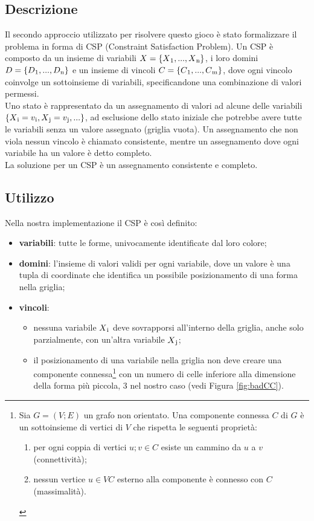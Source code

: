 \subsection{Descrizione}
Il secondo approccio utilizzato per risolvere questo gioco è stato formalizzare il problema in forma di CSP (Constraint Satisfaction Problem). Un CSP è composto da un insieme di variabili $X = \{X\textsubscript{1},...,X\textsubscript{n}\}$, i loro domini  $D = \{D\textsubscript{1},...,D\textsubscript{n}\}$ e un insieme di vincoli  $C = \{C\textsubscript{1},...,C\textsubscript{m}\}$, dove ogni vincolo coinvolge un sottoinsieme di variabili, specificandone una combinazione di valori permessi.\\
Uno stato è rappresentato da un assegnamento di valori ad alcune delle variabili $\{X\textsubscript{i} = v\textsubscript{i}, X\textsubscript{j} = v\textsubscript{j},...\}$, ad esclusione dello stato iniziale che potrebbe avere tutte le variabili senza un valore assegnato (griglia vuota).
Un assegnamento che non viola nessun vincolo è chiamato consistente, mentre un assegnamento dove ogni variabile ha un valore è detto completo. \\
La soluzione per un CSP è un assegnamento consistente e completo.

\subsection{Utilizzo}
Nella nostra implementazione il CSP è così definito:
\begin{itemize}
	\item \textbf{variabili}: tutte le forme, univocamente identificate dal loro colore;
	\item \textbf{domini}: l'insieme di valori validi per ogni variabile, dove un valore è una tupla di coordinate che identifica un possibile posizionamento di una forma nella griglia;
	\item \textbf{vincoli}: 
		\begin{itemize}
			\item nessuna variabile $X\textsubscript{i}$ deve sovrapporsi all'interno della griglia, anche solo parzialmente, con un'altra variabile $X\textsubscript{j}$;
			\item il posizionamento di una variabile nella griglia non deve creare una componente connessa\footnote{\label{nota} Sia $G = (V;E)$ un grafo non orientato. Una
				componente connessa $C$ di $G$ è un sottoinsieme di vertici di $V$ che rispetta le seguenti proprietà:
				\begin{enumerate}
					\item per ogni coppia di vertici $u;v \in C$ esiste un cammino da $u$ a $v$ (connettività);
					\item nessun vertice $u \in VC$ esterno alla componente è connesso con $C$ (massimalità).
				\end{enumerate}
			}  con un numero di celle inferiore alla dimensione della forma più piccola, 3 nel nostro caso (vedi Figura \ref{fig:badCC}).
		\end{itemize}
\end{itemize}

